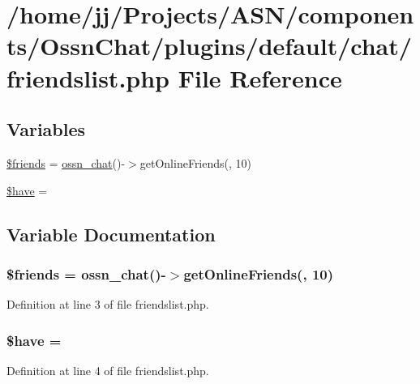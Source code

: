 \hypertarget{friendslist_8php}{}\section{/home/jj/\+Projects/\+A\+S\+N/components/\+Ossn\+Chat/plugins/default/chat/friendslist.php File Reference}
\label{friendslist_8php}
\subsection*{Variables}
\begin{DoxyCompactItemize}
\item 
\hyperlink{friendslist_8php_afb66104a0d5a5b286634a265d216b8d6}{\$friends} = \hyperlink{ossn_8lib_8chat_8php_adfe2d47e3e6a6825beb8e3b9c8d4c6dd}{ossn\+\_\+chat}()-\/$>$get\+Online\+Friends(\textquotesingle{}\textquotesingle{}, 10)
\item 
\hyperlink{friendslist_8php_aee77341b5992b0b68f284db0023a9133}{\$have} = \textquotesingle{}\textquotesingle{}
\end{DoxyCompactItemize}


\subsection{Variable Documentation}
\subsubsection[{\texorpdfstring{\$friends}{$friends}}]{\setlength{\rightskip}{0pt plus 5cm}\$friends = {\bf ossn\+\_\+chat}()-\/$>$get\+Online\+Friends(\textquotesingle{}\textquotesingle{}, 10)}\hypertarget{friendslist_8php_afb66104a0d5a5b286634a265d216b8d6}{}\label{friendslist_8php_afb66104a0d5a5b286634a265d216b8d6}


Definition at line 3 of file friendslist.\+php.

\subsubsection[{\texorpdfstring{\$have}{$have}}]{\setlength{\rightskip}{0pt plus 5cm}\$have = \textquotesingle{}\textquotesingle{}}\hypertarget{friendslist_8php_aee77341b5992b0b68f284db0023a9133}{}\label{friendslist_8php_aee77341b5992b0b68f284db0023a9133}


Definition at line 4 of file friendslist.\+php.

